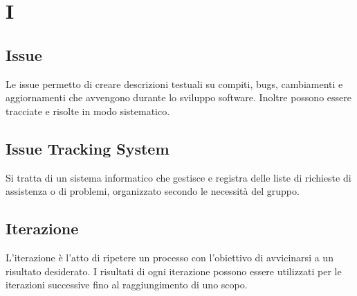 \section{I}

\subsection{Issue}
Le issue permetto di creare descrizioni testuali su compiti, bugs, cambiamenti e aggiornamenti che avvengono durante lo sviluppo software.  Inoltre possono essere tracciate e risolte in modo sistematico.

\subsection{Issue Tracking System}
Si tratta di un sistema informatico che gestisce e registra delle liste di richieste di assistenza o di problemi, organizzato secondo le necessità del gruppo.

\subsection{Iterazione}
L'iterazione è l'atto di ripetere un processo con l'obiettivo di avvicinarsi a un risultato desiderato.  I risultati di ogni iterazione possono essere utilizzati per le iterazioni successive fino al raggiungimento di uno scopo.
\clearpage